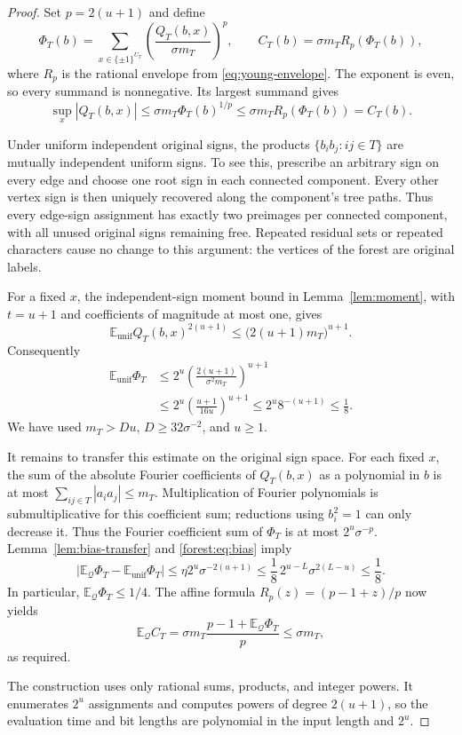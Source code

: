 \documentclass[letterpaper,11pt]{article}
\theoremstyle{definition}
\newcommand{\E}{\mathbb E}
\begin{document}
\begin{proof}
Set $p=2(u+1)$ and define
\begin{equation}
 \Phi_T(b)=\sum_{x\in\{\pm1\}^{U_T}}
       \left(\frac{Q_T(b,x)}{\sigma m_T}\right)^p,
 \qquad
 C_T(b)=\sigma m_T R_p(\Phi_T(b)),
 \label{forest:eq:potential}
\end{equation}
where $R_p$ is the rational envelope from
\eqref{eq:young-envelope}.  The exponent is even, so every summand is
nonnegative.  Its largest summand gives
\[
 \sup_x|Q_T(b,x)|
 \leq\sigma m_T\Phi_T(b)^{1/p}
 \leq\sigma m_T R_p(\Phi_T(b))=C_T(b).
\]

Under uniform independent original signs, the products
$\{b_ib_j:ij\in T\}$ are mutually independent uniform signs.  To
see this, prescribe an arbitrary sign on every edge and choose one
root sign in each connected component.  Every other vertex sign is
then uniquely recovered along the component's tree paths.  Thus
every edge-sign assignment has exactly two preimages per connected
component, with all unused original signs remaining free.  Repeated
residual sets or repeated characters cause no change to this argument:
the vertices of the forest are original labels.

For a fixed $x$, the independent-sign moment bound in
Lemma~\ref{lem:moment}, with $t=u+1$ and coefficients of magnitude
at most one, gives
\[
 \E_{\mathrm{unif}}Q_T(b,x)^{2(u+1)}
 \leq\bigl(2(u+1)m_T\bigr)^{u+1}.
\]
Consequently
\begin{align}
 \E_{\mathrm{unif}}\Phi_T
 &\leq 2^u
       \left(\frac{2(u+1)}{\sigma^2m_T}\right)^{u+1}
 \nonumber\\
 &\leq 2^u
       \left(\frac{u+1}{16u}\right)^{u+1}
 \leq 2^u8^{-(u+1)}
 \leq\frac18.
 \label{forest:eq:uniform-moment}
\end{align}
We have used $m_T>Du$, $D\geq32\sigma^{-2}$, and $u\geq1$.

It remains to transfer this estimate on the original sign space.
For each fixed $x$, the sum of the absolute Fourier coefficients of
$Q_T(b,x)$ as a polynomial in $b$ is at most
$\sum_{ij\in T}|a_ia_j|\leq m_T$.  Multiplication of Fourier
polynomials is submultiplicative for this coefficient sum; reductions
using $b_i^2=1$ can only decrease it.  Thus the Fourier coefficient
sum of $\Phi_T$ is at most $2^u\sigma^{-p}$.  Lemma~\ref{lem:bias-transfer}
and \eqref{forest:eq:bias} imply
\begin{equation}
 \bigl|\E_{\mathcal Q}\Phi_T-\E_{\mathrm{unif}}\Phi_T\bigr|
 \leq\eta2^u\sigma^{-2(u+1)}
 \leq\frac18\,2^{u-L}\sigma^{2(L-u)}
 \leq\frac18.
 \label{forest:eq:transfer}
\end{equation}
In particular, $\E_{\mathcal Q}\Phi_T\leq1/4$.  The affine formula
$R_p(z)=(p-1+z)/p$ now yields
\[
 \E_{\mathcal Q}C_T
 =\sigma m_T\frac{p-1+\E_{\mathcal Q}\Phi_T}{p}
 \leq\sigma m_T,
\]
as required.

The construction uses only rational sums, products, and integer
powers.  It enumerates $2^u$ assignments and computes powers of
degree $2(u+1)$, so the evaluation time and bit lengths are polynomial
in the input length and $2^u$.
\end{proof}
\end{document}
